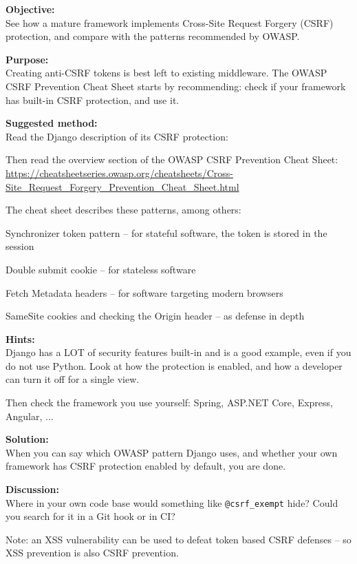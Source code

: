 \documentclass[a4paper,11pt,notitlepage]{report}
\begin{document}
{\bf Objective:}\\
See how a mature framework implements Cross-Site Request Forgery (CSRF) protection, and compare with the patterns recommended by OWASP.

{\bf Purpose:}\\
Creating anti-CSRF tokens is best left to existing middleware. The OWASP CSRF Prevention Cheat Sheet starts by recommending: check if your framework has built-in CSRF protection, and use it.

{\bf Suggested method:}\\
Read the Django description of its CSRF protection:\\

Then read the overview section of the OWASP CSRF Prevention Cheat Sheet:\\
\url{https://cheatsheetseries.owasp.org/cheatsheets/Cross-Site_Request_Forgery_Prevention_Cheat_Sheet.html}

The cheat sheet describes these patterns, among others:
\begin{list2}
\item Synchronizer token pattern -- for stateful software, the token is stored in the session
\item Double submit cookie -- for stateless software
\item Fetch Metadata headers -- for software targeting modern browsers
\item SameSite cookies and checking the Origin header -- as defense in depth
\end{list2}

{\bf Hints:}\\
Django has a LOT of security features built-in and is a good example, even if you do not use Python. Look at how the protection is enabled, and how a developer can turn it off for a single view.

Then check the framework you use yourself: Spring, ASP.NET Core, Express, Angular, ...

{\bf Solution:}\\
When you can say which OWASP pattern Django uses, and whether your own framework has CSRF protection enabled by default, you are done.

{\bf Discussion:}\\
Where in your own code base would something like \verb+@csrf_exempt+ hide? Could you search for it in a Git hook or in CI?

Note: an XSS vulnerability can be used to defeat token based CSRF defenses -- so XSS prevention is also CSRF prevention.
\end{document}
